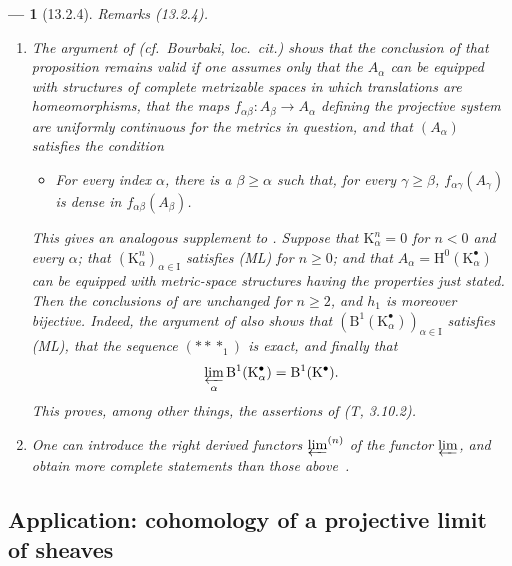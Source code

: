 \documentclass[oneside]{amsart}
\theoremstyle{ega-env-style}
\newtheorem*{env}{---}
\theoremstyle{ega-thm-env-style}
\theoremstyle{ega-defn-env-style}
\def\geq{\geqslant}                 %
\def\HH{\mathrm{H}}                 %
\let\EGAOriginalLabel\label
\renewcommand{\label}[1]{\phantomsection\EGAOriginalLabel{#1}}
\begin{document}
\begin{env}[13.2.4]
\label{0.13.2.4}
\emph{Remarks} (13.2.4).
\begin{enumerate}
  \item[{\rm(i)}]
  The argument of 
  (cf.\ Bourbaki, \emph{loc.\ cit.}) shows that the conclusion of
  that proposition remains valid if one assumes only that the
  $A_\alpha$ can be equipped with structures of complete metrizable
  spaces in which translations are homeomorphisms, that the maps
  $f_{\alpha\beta}:A_\beta\longrightarrow A_\alpha$ defining the
  projective system are uniformly continuous for the metrics in
  question, and that $(A_\alpha)$ satisfies the condition
  \begin{itemize}
    \item[\textbf{(ML')}]
    \emph{For every index $\alpha$, there is a $\beta\geq\alpha$ such
    that, for every $\gamma\geq\beta$,
    $f_{\alpha\gamma}(A_\gamma)$ is dense in
    $f_{\alpha\beta}(A_\beta)$.}
  \end{itemize}

  This gives an analogous supplement to .
  Suppose that $\mathrm{K}^n_\alpha=0$ for $n<0$ and every $\alpha$;
  that
  $(\mathrm{K}^n_\alpha)_{\alpha\in\mathrm{I}}$ satisfies (ML) for
  $n\geq0$; and that
  $A_\alpha=\HH^0(\mathrm{K}^\bullet_\alpha)$ can be equipped with
  metric-space structures having the properties just stated.
  Then the conclusions of  are unchanged for
  $n\geq2$, and $h_1$ is moreover \emph{bijective}.
  Indeed, the argument of  also shows that
  $(\mathrm{B}^1(\mathrm{K}^\bullet_\alpha))_{\alpha\in\mathrm{I}}$
  satisfies (ML), that the sequence $(***_1)$ is exact, and finally
  that
  \[
    \varprojlim_\alpha
    \mathrm{B}^1(\mathrm{K}^\bullet_\alpha)
    =
    \mathrm{B}^1(\mathrm{K}^\bullet).
  \]
  This proves, among other things, the assertions of (T, 3.10.2).

  \item[{\rm(ii)}]
  One can introduce the right derived functors
  $\varprojlim^{(n)}$ of the functor $\varprojlim$, and obtain more
  complete statements than those above~\cite{III-28}.
\end{enumerate}
\end{env}

\subsection{Application: cohomology of a projective limit of sheaves}
\label{subsection:0.13.3}
\end{document}
